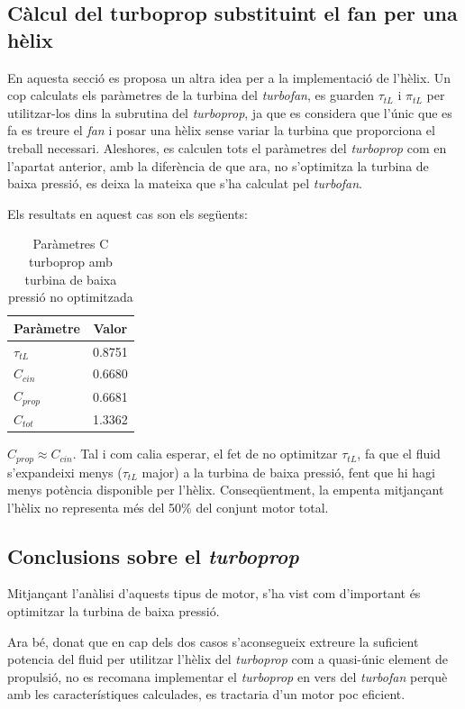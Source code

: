 \subsection{Càlcul del turboprop substituint el fan per una hèlix}
En aquesta secció es proposa un altra idea per a la implementació de l'hèlix. Un cop calculats els paràmetres de la turbina del \textit{turbofan}, es guarden $\tau_{tL}$ i $\pi_{tL}$  per utilitzar-los dins la subrutina del \textit{turboprop}, ja que es considera que l'únic que es fa es treure el \textit{fan} i posar una hèlix sense variar la turbina que proporciona el treball necessari. Aleshores, es calculen tots el paràmetres del \textit{turboprop} com en l'apartat anterior, amb la diferència de que ara, no s'optimitza la turbina de baixa pressió, es deixa la mateixa que s'ha calculat pel \textit{turbofan}.

\noindent Els resultats en aquest cas son els següents:
\begin{table}[H]
	\centering
	\begin{tabular}{lc}
		\toprule[3pt]
		\textbf{Paràmetre}&\textbf{Valor}\\
		\midrule[1pt]
		$\tau_{tL}$ & 0.8751\\
		$C_{cin}$ & 0.6680\\
		$C_{prop}$ & 0.6681\\
		$C_{tot}$ & 1.3362\\
		
		\bottomrule[2pt]
	\end{tabular}
	\label{C_opti2}
	\caption{Paràmetres C turboprop amb turbina de baixa pressió no optimitzada}
\end{table}
\noindent $C_{prop}\approx C_{cin}$. Tal i com calia esperar, el fet de no optimitzar $\tau_{tL}$, fa que el fluid s'expandeixi menys ($\tau_{tL}$ major) a la turbina de baixa pressió, fent que hi hagi menys potència disponible per l'hèlix. Conseqüentment, la empenta mitjançant l'hèlix no representa més del 50\% del conjunt motor total.

\subsection{Conclusions sobre el \textit{turboprop}}
Mitjançant l'anàlisi d'aquests tipus de motor, s'ha vist com d'important és optimitzar la turbina de baixa pressió.

\noindent Ara bé, donat que en cap dels dos casos s'aconsegueix extreure la suficient potencia del fluid per utilitzar l'hèlix del \textit{turboprop} com a quasi-únic element de propulsió, no es recomana implementar el \textit{turboprop} en vers del \textit{turbofan} perquè amb les característiques calculades, es tractaria d'un motor poc eficient.

